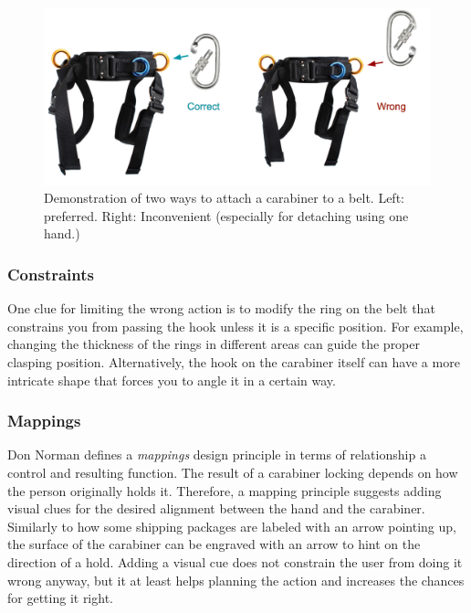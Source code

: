 \documentclass[12pt,letterpaper]{article}
\begin{document}
\begin{figure}[h]
\centering
\includegraphics[scale=.35]{figures/p3/flying_trapeze.png}
\caption{Demonstration of two ways to attach a carabiner to a belt. Left: preferred. Right: Inconvenient (especially for detaching using one hand.)}
\label{fig::1}
\end{figure}

\subsubsection*{Constraints}
One clue for limiting the wrong action is to modify the ring on the belt that constrains you from passing the hook unless it is a specific position. For example, changing the thickness of the rings in different areas can guide the proper clasping position. Alternatively, the hook on the carabiner itself can have a more intricate shape that forces you to angle it in a certain way.

\subsubsection*{Mappings}
Don Norman defines a  \textit{mappings} design principle in terms of relationship a control and resulting function\cite{norman2013design}. The result of a carabiner locking depends on how the person originally holds it. Therefore, a mapping principle suggests adding visual clues for the desired alignment between the hand and the carabiner. Similarly to how some shipping packages are labeled with an arrow pointing up, the surface of the carabiner can be engraved with an arrow to hint on the direction of a hold. Adding a visual cue does not constrain the user from doing it wrong anyway, but it at least helps planning the action and increases the chances for getting it right.
\end{document}

